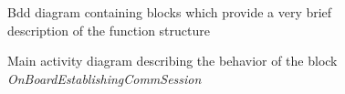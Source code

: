 \documentclass{template/openetcs_report}
\begin{document}
\begin{figure}[H]
  \centering
  \caption{Bdd diagram containing blocks which provide a very brief description of the function structure}
  \label{fig:System_Behavior}
\end{figure}

\begin{figure}
  \centering
  \caption{Main activity diagram describing the behavior of the block \emph{OnBoardEstablishingCommSession}}
  \label{fig:EstablishCommSession}
\end{figure}
\end{document}
